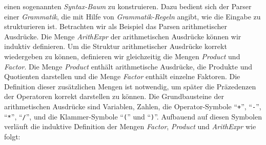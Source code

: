 einen sogenannten \emph{Syntax-Baum} zu konstruieren.  Dazu bedient sich der Parser einer
\emph{Grammatik}, die mit Hilfe von \emph{Grammatik-Regeln} angibt, wie die Eingabe zu
strukturieren ist.  Betrachten wir als Beispiel das Parsen arithmetischer Ausdr\"ucke.  Die
Menge \textsl{ArithExpr} der arithmetischen Ausdr\"ucke k\"onnen wir induktiv definieren.  
Um die Struktur arithmetischer Ausdr\"ucke korrekt wiedergeben zu k\"onnen, definieren wir
gleichzeitig die Mengen \textsl{Product} und \textsl{Factor}.  
Die Menge \textsl{Product} enth\"alt arithmetische
Ausdr\"ucke, die Produkte und Quotienten darstellen und die Menge \textsl{Factor} enth\"alt
einzelne Faktoren.  Die Definition dieser zus\"atzlichen Mengen ist notwendig, um sp\"ater die
Pr\"azedenzen der Operatoren korrekt darstellen zu k\"onnen.
Die Grundbausteine der arithmetischen Ausdr\"ucke sind Variablen, Zahlen, die
Operator-Symbole 
``\texttt{+}'', ``\texttt{-}'', ``\texttt{*}'', ``\texttt{/}'',
und die Klammer-Symbole ``\texttt{(}'' und ``\texttt{)}''.  Aufbauend auf diesen Symbolen
verl\"auft die induktive Definition der Mengen \textsl{Factor}, \textsl{Product} und
\textsl{ArithExpr} wie folgt:
